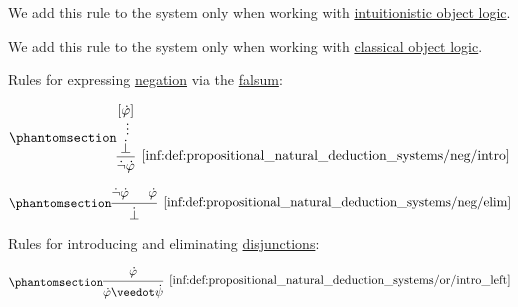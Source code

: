 \begin{definition}
\begin{thmenum}
\begin{paracol}{2}
      \switchcolumn*

      We add this rule to the system only when working with \hyperref[con:intuitionistic_logic]{intuitionistic object logic}.

      \switchcolumn

      We add this rule to the system only when working with \hyperref[con:classical_logic]{classical object logic}.
    \end{paracol}

     Rules for expressing \hyperref[def:propositional_alphabet/negation]{negation} via the \hyperref[def:propositional_alphabet/constants/falsum]{falsum}:
    \begin{paracol}{2}
      \begin{leftcolumn}
        \ParacolAlignmentHack
        \begin{equation*}\taglabel[\ensuremath{ \neg_+ }]{inf:def:propositional_natural_deduction_systems/neg/intro}
          \begin{prooftree}
            \hypo{ [\syn\varphi] }
            \ellipsis {} { \synbot }
            \infer1[\ref{inf:def:propositional_natural_deduction_systems/neg/intro}]{ \synneg \syn\varphi }
          \end{prooftree}
        \end{equation*}
      \end{leftcolumn}

      \begin{rightcolumn}
        \ParacolAlignmentHack
        \begin{equation*}\taglabel[\ensuremath{ \neg_- }]{inf:def:propositional_natural_deduction_systems/neg/elim}
          \begin{prooftree}
            \hypo{ \synneg \syn\varphi }
            \hypo{ \syn\varphi }
            \infer2[\ref{inf:def:propositional_natural_deduction_systems/neg/elim}]{ \synbot }
          \end{prooftree}
        \end{equation*}
      \end{rightcolumn}
    \end{paracol}

     Rules for introducing and eliminating \hyperref[def:propositional_alphabet/connectives/disjunction]{disjunctions}:
    \begin{paracol}{3}
      \begin{nthcolumn}{0}
        \ParacolAlignmentHack
        \begin{equation*}\taglabel[\ensuremath{ \vee_{+L} }]{inf:def:propositional_natural_deduction_systems/or/intro_left}
          \begin{prooftree}
            \hypo{ \syn\varphi }
            \infer1[\ref{inf:def:propositional_natural_deduction_systems/or/intro_left}]{ \syn\varphi \synvee \syn\psi }
          \end{prooftree}
        \end{equation*}
      \end{nthcolumn}


\end{paracol}
\end{thmenum}
\end{definition}
